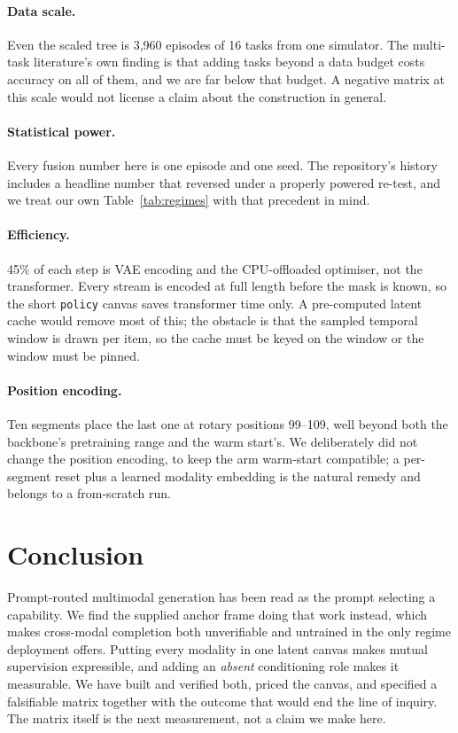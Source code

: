 \documentclass{article}
\begin{document}
\paragraph{Data scale.} Even the scaled tree is 3{,}960 episodes of 16 tasks from one simulator.
The multi-task literature's own finding is that adding tasks beyond a data budget costs accuracy
on all of them, and we are far below that budget. A negative matrix at this scale would not
license a claim about the construction in general.

\paragraph{Statistical power.} Every fusion number here is one episode and one seed. The
repository's history includes a headline number that reversed under a properly powered re-test,
and we treat our own Table~\ref{tab:regimes} with that precedent in mind.

\paragraph{Efficiency.} 45\% of each step is VAE encoding and the CPU-offloaded optimiser, not
the transformer. Every stream is encoded at full length before the mask is known, so the short
\texttt{policy} canvas saves transformer time only. A pre-computed latent cache would remove most
of this; the obstacle is that the sampled temporal window is drawn per item, so the cache must be
keyed on the window or the window must be pinned.

\paragraph{Position encoding.} Ten segments place the last one at rotary positions 99--109, well
beyond both the backbone's pretraining range and the warm start's. We deliberately did not change
the position encoding, to keep the arm warm-start compatible; a per-segment reset plus a learned
modality embedding is the natural remedy and belongs to a from-scratch run.

\section{Conclusion}

Prompt-routed multimodal generation has been read as the prompt selecting a capability. We find
the supplied anchor frame doing that work instead, which makes cross-modal completion both
unverifiable and untrained in the only regime deployment offers. Putting every modality in one
latent canvas makes mutual supervision expressible, and adding an \emph{absent} conditioning role
makes it measurable. We have built and verified both, priced the canvas, and specified a
falsifiable matrix together with the outcome that would end the line of inquiry. The matrix
itself is the next measurement, not a claim we make here.
\end{document}
